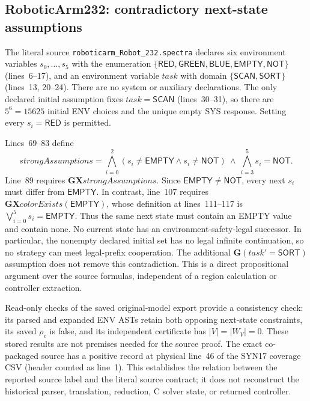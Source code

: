 \documentclass[11pt]{article}
\begin{document}
\subsection{RoboticArm232: contradictory next-state assumptions}
\label{supp:roboticarm232}
The literal source \texttt{roboticarm\_Robot\_232.spectra} declares six
environment variables $s_0,\ldots,s_5$ with the enumeration
$\{\mathsf{RED},\mathsf{GREEN},\mathsf{BLUE},\mathsf{EMPTY},\mathsf{NOT}\}$
(lines~6--17), and an environment variable $\mathit{task}$ with domain
$\{\mathsf{SCAN},\mathsf{SORT}\}$ (lines~13, 20--24). There are no system or
auxiliary declarations. The only declared initial assumption fixes
$\mathit{task}=\mathsf{SCAN}$ (lines~30--31),
so there are $5^6=15625$ initial ENV choices and the unique empty SYS
response. Setting every $s_i=\mathsf{RED}$ is permitted.

Lines~69--83 define
\[
 \mathit{strongAssumptions}=
 \bigwedge_{i=0}^{2}
    (s_i\ne\mathsf{EMPTY}\land s_i\ne\mathsf{NOT})
 \ \land\ \bigwedge_{i=3}^{5}s_i=\mathsf{NOT}.
\]
Line~89 requires $\mathbf G\mathbf X\mathit{strongAssumptions}$.
Since $\mathsf{EMPTY}\ne\mathsf{NOT}$, every next $s_i$ must differ from
$\mathsf{EMPTY}$. In contrast, line~107 requires
$\mathbf G\mathbf X\mathit{colorExists}(\mathsf{EMPTY})$, whose definition
at lines~111--117 is $\bigvee_{i=0}^{5}s_i=\mathsf{EMPTY}$.
Thus the same next state must contain an EMPTY value and contain none.
No current state has an environment-safety-legal successor. In particular,
the nonempty declared initial set has no legal infinite continuation,
so no strategy can meet legal-prefix cooperation. The additional
$\mathbf G(\mathit{task}'=\mathsf{SORT})$ assumption does not remove this
contradiction. This is a direct propositional argument over the source
formulas, independent of a region calculation or controller extraction.

Read-only checks of the saved original-model export provide a consistency
check: its parsed and expanded ENV ASTs retain both opposing next-state
constraints, its saved $\rho_e$ is false, and its independent certificate
has $|V|=|W_V|=0$. These stored results are not premises needed for the
source proof. The exact co-packaged source has a positive record at
physical line~46 of the SYN17 coverage CSV (header counted as line~1).
This establishes the relation between the reported source label and the
literal source contract; it does not reconstruct the historical parser,
translation, reduction, C solver state, or returned controller.
\end{document}
